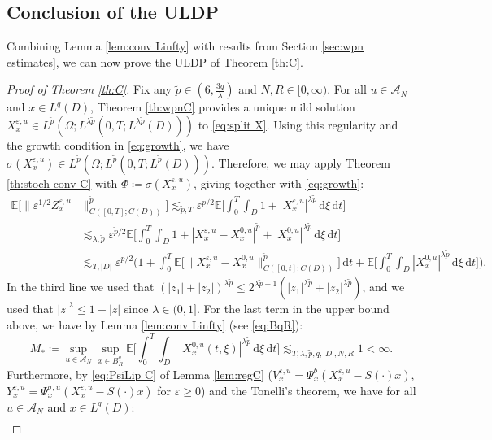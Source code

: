 \documentclass{amsart}
\theoremstyle{plain}
\theoremstyle{remark}
\theoremstyle{plain}
\numberwithin{equation}{section}
\newcommand{\Cper}{C(D)}
\newcommand{\ceqq}{\coloneqq}
\newcommand{\E}{{\mathbb E}}
\newcommand{\eps}{\varepsilon}
\newcommand{\Om}{\Omega}
\newcommand{\A}{{\mathcal A}}
\newcommand{\dd}{\,\mathrm{d}}
\begin{document}
\subsection{Conclusion of the ULDP}\label{sub:concl C}

Combining Lemma \ref{lem:conv Linfty} with   results from Section \ref{sec:wpn estimates}, we can now prove the ULDP of Theorem \ref{th:C}. 

\begin{proof}[Proof of Theorem \ref{th:C}] 
Fix any $\tilde p\in(6,\frac{3q}{\lambda})$ and $N,R\in[0,\infty)$. For all $u\in\A_N$ and $x\in L^q(D)$,  Theorem \ref{th:wpnC} provides a unique mild solution  $X_x^{\eps,u}\in L^{\tilde p}(\Om; L^{\lambda\tilde p}(0,T;L^{\lambda\tilde p}(D)))$ to \eqref{eq:split X}. Using this regularity and the growth condition in \eqref{eq:growth}, we have $\sigma(X_x^{\eps,u})\in  
L^{\tilde p}(\Om;L^{\tilde p}(0,T;L^{\tilde p}(D)))$. 
Therefore, we may apply Theorem \ref{th:stoch conv C} with $\Phi\ceqq \sigma(X_x^{\eps,u})$, giving together with \eqref{eq:growth}:  
\begin{align*}
\E[ \|\eps^{1/2}Z_x^{\eps,u}&\|_{C([0,T];\Cper)}^{\tilde p}] 
\lesssim_{\tilde p,T}\eps^{\tilde p/2}\E\Big[\int_0^T\int_D 1+|X_x^{\eps,u}|^{\lambda \tilde p}\dd\xi\dd t\Big]\\
&\lesssim_{\lambda, \tilde p}\eps^{\tilde p/2}\E\Big[\int_0^T\int_D 1+ |X_x^{\eps,u}-X_x^{0,u}|^{\tilde p}+|X_x^{0,u}|^{\lambda \tilde p}\dd\xi\dd t\Big] \\
&\lesssim_{T,|D|}\eps^{\tilde p/2}\bigg(1+\int_0^T \E\big[\|X_x^{\eps,u}-X_x^{0,u}\|_{C([0,t];\Cper)}^{\tilde p}\big]\dd t+\E\Big[\int_0^T\int_D  |X_x^{0,u}|^{\lambda \tilde p}\dd\xi\dd t\Big]\bigg). 
\end{align*}
In the third line we used that $(|z_1|+|z_2|)^{\lambda \tilde p}\leq 2^{\lambda \tilde p-1}( |z_1|^{\lambda \tilde p}+|z_2|^{\lambda \tilde p})$, and we used that $|z|^\lambda\leq 1+|z|$ since $\lambda\in(0,1]$. 
For the last term in the upper bound above, we have by Lemma \ref{lem:conv Linfty} (see \eqref{eq:BqR}): 
\[
M_*\ceqq\sup_{u\in\A_N}\sup_{x\in B_R^q} \E\Big[\int_0^T\int_D  |X_x^{0,u}(t,\xi)|^{\lambda\tilde p}\dd\xi\dd t\Big]\lesssim_{T,\lambda,\tilde p,q,|D|, N,R}1<\infty.
\]
Furthermore, by \eqref{eq:PsiLip C} of Lemma  \ref{lem:regC} ($V_x^{\eps,u}=\Psi_x^b(X_x^{\eps,u}-S(\cdot)x)$, $Y_x^{\eps,u}=\Psi_x^{\sigma,u}(X_x^{\eps,u}-S(\cdot)x)$ for $\eps\geq 0$) and the Tonelli's theorem, we have for all $u\in\A_N$ and $x\in L^q(D)$: 
\begin{align*}

\end{align*}
\end{proof}
\end{document}
